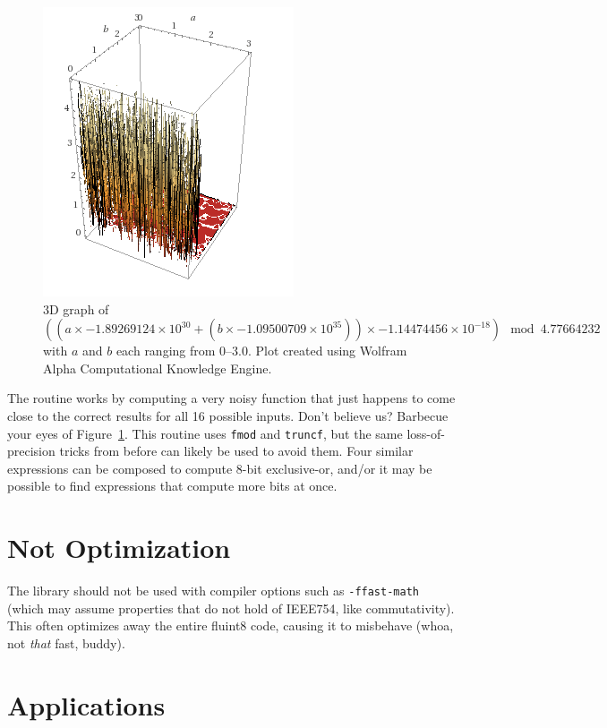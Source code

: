\documentclass{acmsiggraph}
\theoremstyle{remark}
\theoremstyle{definition}
\begin{document}
\begin{figure}[tb!]
\begin{center}
\includegraphics[width=0.6\columnwidth]{xor2bitcube}
\end{center}
\caption{
  3D graph of
  $((a \times -1.89269124 \!\!\times\!\! 10^{30} + (b \times -1.09500709 \!\!\times\!\! 10^{35})) \times -1.14474456 \!\!\times\!\! 10^{-18}) \mod 4.77664232$
  with $a$ and $b$ each ranging from $0$--$3.0$.
%
  {\small Plot created using Wolfram Alpha Computational Knowledge Engine.}} \label{fig:xor2bit}
\end{figure}

The routine works by computing a very noisy function that just happens
to come close to the correct results for all 16 possible inputs. Don't
believe us? Barbecue your eyes of Figure~\ref{fig:xor2bit}. This
routine uses {\tt fmod} and {\tt truncf}, but the same
loss-of-precision tricks from before can likely be used to avoid them.
Four similar expressions can be composed to compute 8-bit exclusive-or,
and/or it may be possible to find expressions that compute more bits
at once.

\section{Not Optimization}

The library should not be used with compiler options such as
\verb+-ffast-math+ (which may assume properties that do not hold of
IEEE754, like commutativity). This often optimizes away the entire
fluint8 code, causing it to misbehave (whoa, not {\em that} fast,
buddy).

\section{Applications}
\end{document}
